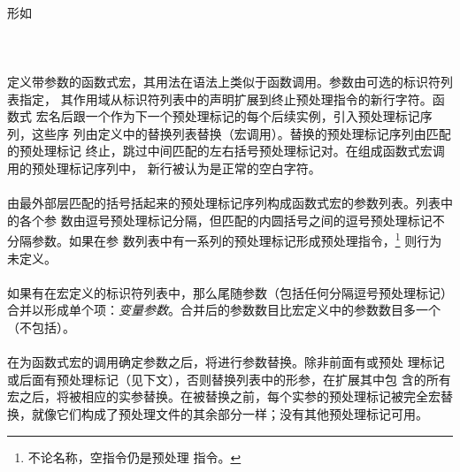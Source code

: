 \paragraph{}
形如                                                                          \\
\mbox{\hspace{4em}  \tm{)} }           \\
\mbox{\hspace{4em}  
  }                                             \\
\mbox{\hspace{4em} 
   }                                \\
定义带参数的函数式宏，其用法在语法上类似于函数调用。参数由可选的标识符列表指定，
其作用域从标识符列表中的声明扩展到终止预处理指令的新行字符。函数式
宏名后跟一个\tm{(}作为下一个预处理标记的每个后续实例，引入预处理标记序列，这些序
列由定义中的替换列表替换（宏调用）。替换的预处理标记序列由匹配的\tm{)}预处理标记
终止，跳过中间匹配的左右括号预处理标记对。在组成函数式宏调用的预处理标记序列中，
新行被认为是正常的空白字符。

\paragraph{}
由最外部层匹配的括号括起来的预处理标记序列构成函数式宏的参数列表。列表中的各个参
数由逗号预处理标记分隔，但匹配的内圆括号之间的逗号预处理标记不分隔参数。如果在参
数列表中有一系列的预处理标记形成预处理指令，\footnote{不论名称，空指令仍是预处理
指令。} 则行为未定义。

\paragraph{}
如果有在宏定义的标识符列表中，那么尾随参数（包括任何分隔逗号预处理标记）
合并以形成单个项：\textit{变量参数}。合并后的参数数目比宏定义中的参数数目多一个
（不包括）。

\paragraph{}
在为函数式宏的调用确定参数之后，将进行参数替换。除非前面有\tm{\#}或\tm{\#\#}预处
理标记或后面有\tm{\#\#}预处理标记（见下文），否则替换列表中的形参，在扩展其中包
含的所有宏之后，将被相应的实参替换。在被替换之前，每个实参的预处理标记被完全宏替
换，就像它们构成了预处理文件的其余部分一样；没有其他预处理标记可用。

